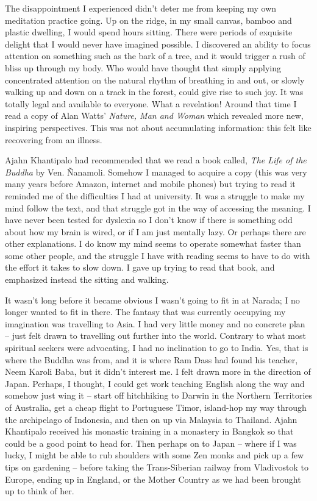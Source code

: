 The disappointment I experienced didn't deter me from keeping my own
meditation practice going. Up on the ridge, in my small canvas, bamboo
and plastic dwelling, I would spend hours sitting. There were periods of
exquisite delight that I would never have imagined possible. I
discovered an ability to focus attention on something such as the bark
of a tree, and it would trigger a rush of bliss up through my body. Who
would have thought that simply applying concentrated attention on the
natural rhythm of breathing in and out, or slowly walking up and down on
a track in the forest, could give rise to such joy. It was totally legal
and available to everyone. What a revelation! Around that time I read a
copy of Alan Watts' \emph{Nature, Man and Woman} which revealed more
new, inspiring perspectives. This was not about accumulating
information: this felt like recovering from an illness.

Ajahn Khantipalo had recommended that we read a book called, \emph{The
Life of the Buddha} by Ven. Ñanamoli. Somehow I managed to acquire a copy
(this was very many years before Amazon, internet and mobile phones) but
trying to read it reminded me of the difficulties I had at university.
It was a struggle to make my mind follow the text, and that struggle got
in the way of accessing the meaning. I have never been tested for
dyslexia so I don't know if there is something odd about how my brain is
wired, or if I am just mentally lazy. Or perhaps there are other
explanations. I do know my mind seems to operate somewhat faster than
some other people, and the struggle I have with reading seems to have to
do with the effort it takes to slow down. I gave up trying to read that
book, and emphasized instead the sitting and walking.

It wasn't long before it became obvious I wasn't going to fit in at
Narada; I no longer wanted to fit in there. The fantasy that was
currently occupying my imagination was travelling to Asia. I had very
little money and no concrete plan -- just felt drawn to travelling out
further into the world. Contrary to what most spiritual seekers were
advocating, I had no inclination to go to India. Yes, that is where the
Buddha was from, and it is where Ram Dass had found his teacher, Neem
Karoli Baba, but it didn't interest me. I felt drawn more in the
direction of Japan. Perhaps, I thought, I could get work teaching
English along the way and somehow just wing it -- start off hitchhiking
to Darwin in the Northern Territories of Australia, get a cheap flight
to Portuguese Timor, island-hop my way through the archipelago of
Indonesia, and then on up via Malaysia to Thailand. Ajahn Khantipalo
received his monastic training in a monastery in Bangkok so that could
be a good point to head for. Then perhaps on to Japan -- where if I was
lucky, I might be able to rub shoulders with some Zen monks and pick up
a few tips on gardening -- before taking the Trans-Siberian railway from
Vladivostok to Europe, ending up in England, or the Mother Country as we
had been brought up to think of her.

